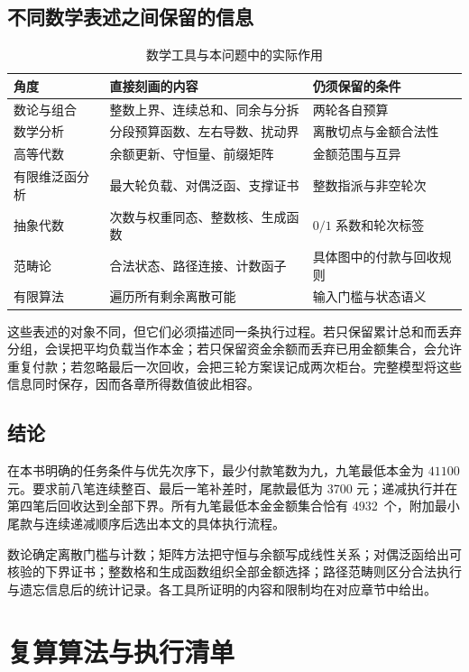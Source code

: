 \documentclass[UTF8,a4paper]{ctexbook}
\theoremstyle{definition}
\numberwithin{equation}{chapter}
\newcommand{\1}{\mathbf{1}}
\newcommand{\OptimalSetCount}{4932}
\begin{document}
\section{不同数学表述之间保留的信息}
\begin{table}[htbp]
\centering
\caption{数学工具与本问题中的实际作用}
\begin{tabularx}{\textwidth}{@{}lXX@{}}
\toprule
角度 & 直接刻画的内容 & 仍须保留的条件\\
\midrule
数论与组合 & 整数上界、连续总和、同余与分拆 & 两轮各自预算\\
数学分析 & 分段预算函数、左右导数、扰动界 & 离散切点与金额合法性\\
高等代数 & 余额更新、守恒量、前缀矩阵 & 金额范围与互异\\
有限维泛函分析 & 最大轮负载、对偶泛函、支撑证书 & 整数指派与非空轮次\\
抽象代数 & 次数与权重同态、整数核、生成函数 & $0/1$ 系数和轮次标签\\
范畴论 & 合法状态、路径连接、计数函子 & 具体图中的付款与回收规则\\
有限算法 & 遍历所有剩余离散可能 & 输入门槛与状态语义\\
\bottomrule
\end{tabularx}
\end{table}

这些表述的对象不同，但它们必须描述同一条执行过程。若只保留累计总和而丢弃分组，会误把平均负载当作本金；若只保留资金余额而丢弃已用金额集合，会允许重复付款；若忽略最后一次回收，会把三轮方案误记成两次柜台。完整模型将这些信息同时保存，因而各章所得数值彼此相容。

\section{结论}
在本书明确的任务条件与优先次序下，最少付款笔数为九，九笔最低本金为 $41100$ 元。要求前八笔连续整百、最后一笔补差时，尾款最低为 $3700$ 元；递减执行并在第四笔后回收达到全部下界。所有九笔最低本金金额集合恰有 \OptimalSetCount\ 个，附加最小尾款与连续递减顺序后选出本文的具体执行流程。

数论确定离散门槛与计数；矩阵方法把守恒与余额写成线性关系；对偶泛函给出可核验的下界证书；整数格和生成函数组织全部金额选择；路径范畴则区分合法执行与遗忘信息后的统计记录。各工具所证明的内容和限制均在对应章节中给出。

\appendix
\chapter{复算算法与执行清单}\label{app:chapter}
\end{document}
